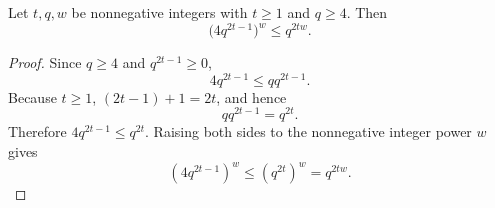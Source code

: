 \begin{helper}
Let \(t,q,w\) be nonnegative integers with \(t\ge1\) and \(q\ge4\).  Then
\[
  \bigl(4q^{2t-1}\bigr)^w\le q^{2tw}.
\]
\end{helper}
\begin{proof}
Since \(q\ge4\) and \(q^{2t-1}\ge0\),
\[
  4q^{2t-1}\le q q^{2t-1}.
\]
Because \(t\ge1\), \((2t-1)+1=2t\), and hence
\[
  q q^{2t-1}=q^{2t}.
\]
Therefore \(4q^{2t-1}\le q^{2t}\).  Raising both sides to the nonnegative
integer power \(w\) gives
\[
  (4q^{2t-1})^w\le(q^{2t})^w=q^{2tw}.
\]
\end{proof}
